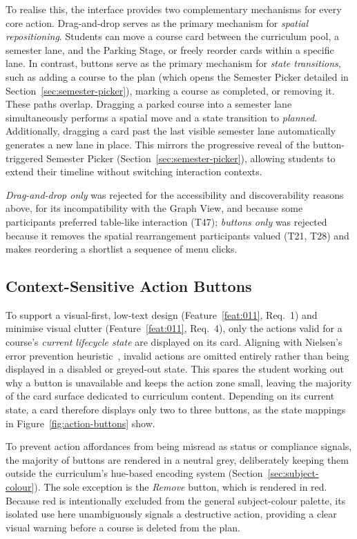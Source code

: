 To realise this, the interface provides two complementary mechanisms for every core action. Drag-and-drop serves as the primary mechanism for \emph{spatial repositioning}. Students can move a course card between the curriculum pool, a semester lane, and the Parking Stage, or freely reorder cards within a specific lane. In contrast, buttons serve as the primary mechanism for \emph{state transitions}, such as adding a course to the plan (which opens the Semester Picker detailed in Section~\ref{sec:semester-picker}), marking a course as completed, or removing it. These paths overlap. Dragging a parked course into a semester lane simultaneously performs a spatial move and a state transition to \emph{planned}. Additionally, dragging a card past the last visible semester lane automatically generates a new lane in place. This mirrors the progressive reveal of the button-triggered Semester Picker (Section~\ref{sec:semester-picker}), allowing students to extend their timeline without switching interaction contexts.

\emph{Drag-and-drop only} was rejected for the accessibility and discoverability reasons above, for its incompatibility with the Graph View, and because some participants preferred table-like interaction (T47); \emph{buttons only} was rejected because it removes the spatial rearrangement participants valued (T21, T28) and makes reordering a shortlist a sequence of menu clicks. 

\subsection{Context-Sensitive Action Buttons}
\label{sec:action-buttons}

To support a visual-first, low-text design (Feature~\ref{feat:011}, Req.~1) and minimise visual clutter (Feature~\ref{feat:011}, Req.~4), only the actions valid for a course's \emph{current lifecycle state} are displayed on its card. Aligning with Nielsen's error prevention heuristic~\cite{nielsen1994}, invalid actions are omitted entirely rather than being displayed in a disabled or greyed-out state. This spares the student working out why a button is unavailable and keeps the action zone small, leaving the majority of the card surface dedicated to curriculum content. Depending on its current state, a card therefore displays only two to three buttons, as the state mappings in Figure~\ref{fig:action-buttons} show.

To prevent action affordances from being misread as status or compliance signals, the majority of buttons are rendered in a neutral grey, deliberately keeping them outside the curriculum's hue-based encoding system (Section~\ref{sec:subject-colour}). The sole exception is the \emph{Remove} button, which is rendered in red. Because red is intentionally excluded from the general subject-colour palette, its isolated use here unambiguously signals a destructive action, providing a clear visual warning before a course is deleted from the plan.

